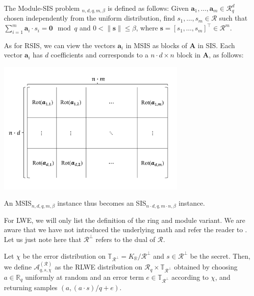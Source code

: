 \begin{definition}
    The Module-SIS problem $_{n, d, q, m, \beta}$ is defined as follows: Given  $\mathbf{a}_1, \ldots, \mathbf{a}_m \in \mathcal{R}_q^d$ chosen independently from the uniform distribution, find $s_1, \ldots, s_m \in \mathcal{R}$ such that $\sum_{i=1}^m \mathbf{a}_i \cdot s_i = \mathbf{0}\mod q$ and $0 < \| \mathbf{s}\| \leq \beta$, where $\mathbf{s} = \left[s_1, \ldots, s_m\right]^\intercal \in \mathcal{R}^m$.
\end{definition} %
As for RSIS, we can view the vectors $\mathbf{a}_i$ in MSIS as blocks of $\mathbf{A}$ in SIS. Each vector $\mathbf{a}_i$ has $d$ coefficients and corresponds to a $n\cdot d \times n$ block in $\mathbf{A}$, as follows:
\begin{center}
    \includegraphics[width=0.7\textwidth]{graphics/MSIS_matrix.pdf}
\end{center}
An MSIS$_{n, d, q, m, \beta}$ instance thus becomes an SIS$_{n\cdot d, q, m \cdot n, \beta}$ instance.


For LWE, we will only list the definition of the ring and module variant. We are aware that we have not introduced the underlying math and refer the reader to \cite{LS15}. Let us just note here that $\mathcal{R}^\perp$ refers to the dual of $\mathcal{R}$.
\begin{definition}
    Let $\chi$ be the error distribution on $\mathbb{T}_{\mathcal{R}^\perp} = K_\mathbb{R} / \mathcal{R}^\perp$ and $s \in \mathcal{R}^\perp$ be the secret. Then, we define $\mathcal{A}_{q, s, \chi}^{(\mathcal{R})}$ as the RLWE distribution on $\mathcal{R}_q \times \mathbb{T}_{\mathcal{R}^\perp}$ obtained by choosing $a \in \mathbb{R}_q$ uniformly at random and an error term $e \in \mathbb{T}_{\mathcal{R}^\perp}$ according to $\chi$, and returning samples $(a, (a \cdot s)/q + e)$.
\end{definition}

